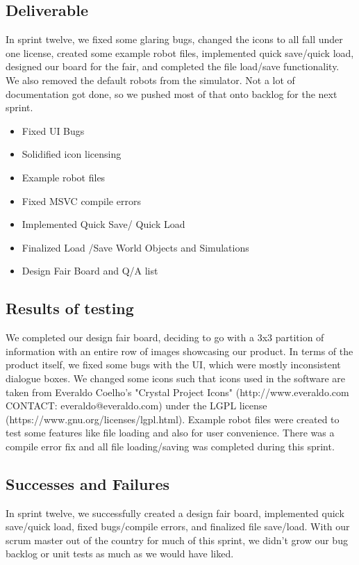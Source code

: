 \subsection{Deliverable}
In sprint twelve, we fixed some glaring bugs, changed the icons to all fall under one license, created some example robot files, implemented quick save/quick load, designed our board for the fair, and completed the file load/save functionality. We also removed the default robots from the simulator. Not a lot of documentation got done, so we pushed most of that onto backlog for the next sprint.

\begin{itemize}
	\item Fixed UI Bugs
	\item Solidified icon licensing
	\item Example robot files
	\item Fixed MSVC compile errors
	\item Implemented Quick Save/ Quick Load
	\item Finalized Load /Save World Objects and Simulations
	\item Design Fair Board and Q/A list
\end{itemize}

\subsection{Results of testing}
We completed our design fair board, deciding to go with a 3x3 partition of information with an entire row of images showcasing our product. In terms of the product itself, we fixed some bugs with the UI, which were mostly inconsistent dialogue boxes. We changed some icons such that icons used in the software are taken from Everaldo Coelho's "Crystal Project Icons" (http://www.everaldo.com CONTACT: everaldo@everaldo.com) under the LGPL license (https://www.gnu.org/licenses/lgpl.html). Example robot files were created to test some features like file loading and also for user convenience. There was a compile error fix and all file loading/saving was completed during this sprint.

\subsection{Successes and Failures}
In sprint twelve, we successfully created a design fair board, implemented quick save/quick load, fixed bugs/compile errors, and finalized file save/load. With our scrum master out of the country for much of this sprint, we didn't grow our bug backlog or unit tests as much as we would have liked.

